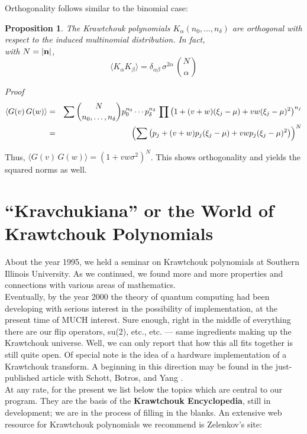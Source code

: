 \documentclass[12pt]{article}
\newtheorem{proposition}[theorem]{Proposition}
\def\ln{\langle}\def\rn{\rangle}
\def\?#1?{{\bf #1}}
\def\.#1.#2.{{#1^{#2}}}
\def\kck #1.#2.{ {#1\choose #2} }
\def\xjm{\xi_j-\mu}
\def\pl{polynomial}
\def\qed{\qquad\framebox[7pt]\medskip\noindent}
\numberwithin{equation}{section}
\begin{document}
Orthogonality follows similar to the binomial case:
\begin{proposition}The Krawtchouk \pl s $K_{\alpha}(n_0,\ldots,n_\delta)$ are orthogonal
with respect to the induced multinomial distribution. In fact, \\ with $N=|\?n?|$,
$$\ln K_{\alpha}K_{\beta}\rn=\delta_{\alpha\beta}\,\.\sigma.2\alpha.\,\kck N.\alpha.$$
\end{proposition}
{\sl Proof }
\begin{eqnarray*}
\ln G(v)\,G(w)\rn&=&\sum\kck N.{n_0,\ldots,n_\delta}.\.p_0.n_0.
\cdots\.p_{\delta}.n_{\delta}.\,\prod\left(1+(v+w)(\xjm)+vw(\xjm)^2
\right)^{n_j}\cr
&=&\left(\sum\left(p_j+(v+w)p_j(\xjm)+vwp_j(\xjm)^2\right)\right)^N\cr
\end{eqnarray*}

Thus, $\ln G(v)\,G(w)\rn=(1+vw\.\sigma.2.)^N$. This shows orthogonality
and yields the squared norms as well.\qed
\bigskip

\section{``Kravchukiana'' or the World of Krawtchouk Polynomials}
About the year 1995, we held a seminar on Krawtchouk polynomials at Southern Illinois University.
As we continued, we found more and more properties and connections with various areas of mathematics.\\

Eventually, by the year 2000 the theory of quantum computing had been developing with serious
interest in the possibility of implementation, at the present time of MUCH interest. Sure enough,
right in the middle of everything there are our flip operators, su(2), etc., etc.  --- same ingredients
making up the Krawtchouk universe. Well, we can only report that how this all fits together is still quite open.
Of special note is the idea of a hardware implementation of a Krawtchouk transform.
A beginning in this direction may be found in the just-published article with Schott, Botros, and
Yang \cite{BY}. \\

At any rate, for the present we list below the topics which are central to our program.
They are the basis of the  {\bf Krawtchouk Encyclopedia}, still in development;
 we are in the process of filling in the blanks.
 An extensive web resource for Krawtchouk polynomials we recommend is Zelenkov's site:\\
\end{document}
